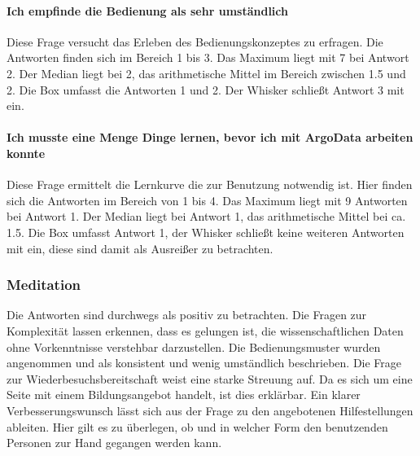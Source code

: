 \paragraph{Ich empfinde die Bedienung als sehr umständlich}
    Diese Frage versucht das Erleben des Bedienungskonzeptes zu erfragen. Die Antworten finden sich im Bereich 1 bis 3. Das Maximum liegt mit 7 bei Antwort 2. Der Median liegt bei 2, das arithmetische Mittel im Bereich zwischen 1.5 und 2. Die Box umfasst die Antworten 1 und 2. Der Whisker schließt Antwort 3 mit ein.
    
\paragraph{Ich musste eine Menge Dinge lernen, bevor ich mit ArgoData arbeiten konnte}
    Diese Frage ermittelt die Lernkurve die zur Benutzung notwendig ist. Hier finden sich die Antworten im Bereich von 1 bis 4. Das Maximum liegt mit 9 Antworten bei Antwort 1. Der Median liegt bei Antwort 1, das arithmetische Mittel bei ca. 1.5. Die Box umfasst Antwort 1, der Whisker schließt keine weiteren Antworten mit ein, diese sind damit als Ausreißer zu betrachten. 
    
\subsubsection{Meditation}
Die Antworten sind durchwegs als positiv zu betrachten. Die Fragen zur Komplexität lassen erkennen, dass es gelungen ist, die wissenschaftlichen Daten ohne Vorkenntnisse verstehbar darzustellen. Die Bedienungsmuster wurden angenommen und als konsistent und wenig umständlich beschrieben. Die Frage zur Wiederbesuchsbereitschaft weist eine starke Streuung auf. Da es sich um eine Seite mit einem Bildungsangebot handelt, ist dies erklärbar.
Ein klarer Verbesserungswunsch lässt sich aus der Frage zu den angebotenen Hilfestellungen ableiten. Hier gilt es  zu überlegen, ob und in welcher Form den benutzenden Personen zur Hand gegangen werden kann.



